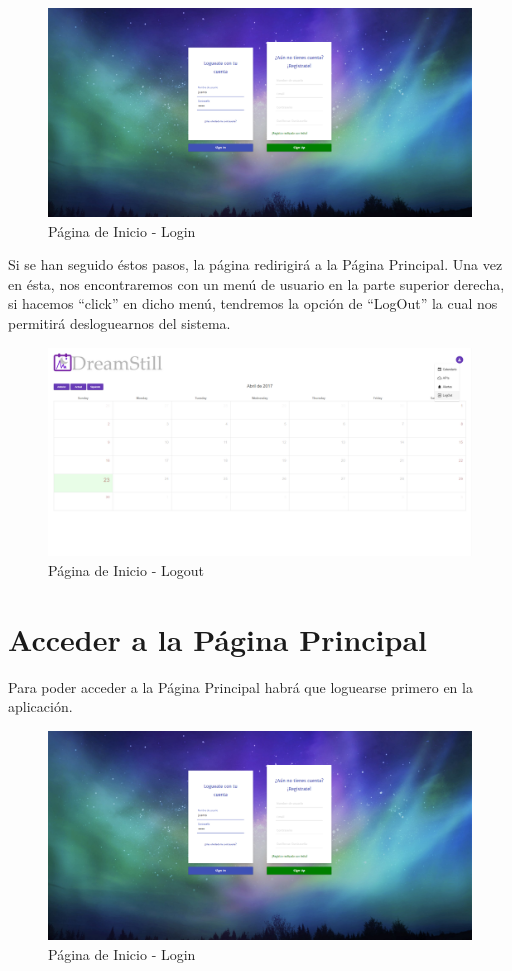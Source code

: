 \documentclass[11pt,openany]{book}
\begin{document}
\begin{figure}[H]
\centering
\includegraphics[totalheight=6cm]{manualUsuario/login.png}
\caption{Página de Inicio - Login}
\end{figure}

Si se han seguido éstos pasos, la página redirigirá a la Página Principal. Una vez en ésta, nos encontraremos con un menú de usuario en la parte superior derecha, si hacemos ``click'' en dicho menú, tendremos la opción de ``LogOut'' la cual nos permitirá desloguearnos del sistema.

\begin{figure}[H]
\centering
\includegraphics[totalheight=6cm]{manualUsuario/logout.png}
\caption{Página de Inicio - Logout}
\end{figure}

\section{Acceder a la Página Principal}

Para poder acceder a la Página Principal habrá que loguearse primero en la aplicación.

\begin{figure}[H]
\centering
\includegraphics[totalheight=6cm]{manualUsuario/login.png}
\caption{Página de Inicio - Login}
\end{figure}
\end{document}
